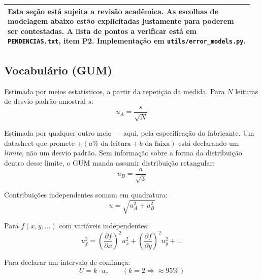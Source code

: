 \documentclass[11pt,a4paper]{article}
\newcommand{\arqv}[1]{\texttt{#1}}
\newenvironment{nota}
  {\par\medskip\noindent\begin{tabular}{|p{0.96\linewidth}|}\hline\rule{0pt}{3ex}}
  {\\[1ex]\hline\end{tabular}\par\medskip}
\begin{document}
\begin{nota}
\textbf{Esta seção está sujeita a revisão acadêmica.} As escolhas de modelagem
abaixo estão explicitadas justamente para poderem ser contestadas. A lista de
pontos a verificar está em \texttt{PENDENCIAS.txt}, item P2. Implementação em
\arqv{utils/error\_models.py}.
\end{nota}

\subsection{Vocabulário (GUM)}

\begin{description}[style=nextline,leftmargin=0.6cm]
  \item[Incerteza Tipo A] Estimada por meios estatísticos, a partir da
    repetição da medida. Para $N$ leituras de desvio padrão amostral $s$:
    \begin{equation}
      u_A = \frac{s}{\sqrt{N}}
      \label{eq:tipoA}
    \end{equation}
  \item[Incerteza Tipo B] Estimada por qualquer outro meio --- aqui, pela
    especificação do fabricante. Um datasheet que promete
    $\pm(a\% \text{ da leitura} + b \text{ da faixa})$ está declarando um
    \emph{limite}, não um desvio padrão. Sem informação sobre a forma da
    distribuição dentro desse limite, o GUM manda assumir distribuição
    retangular:
    \begin{equation}
      u_B = \frac{a}{\sqrt{3}}
      \label{eq:tipoB}
    \end{equation}
  \item[Combinação] Contribuições independentes somam em quadratura:
    \begin{equation}
      u = \sqrt{u_A^2 + u_B^2}
      \label{eq:comb}
    \end{equation}
  \item[Propagação] Para $f(x,y,\dots)$ com variáveis independentes:
    \begin{equation}
      u_f^2 = \left(\frac{\partial f}{\partial x}\right)^2 u_x^2
            + \left(\frac{\partial f}{\partial y}\right)^2 u_y^2 + \dots
      \label{eq:prop}
    \end{equation}
  \item[Incerteza expandida] Para declarar um intervalo de confiança:
    \begin{equation}
      U = k \cdot u_c \qquad (k = 2 \Rightarrow \approx 95\%)
      \label{eq:expandida}
    \end{equation}
\end{description}
\end{document}
